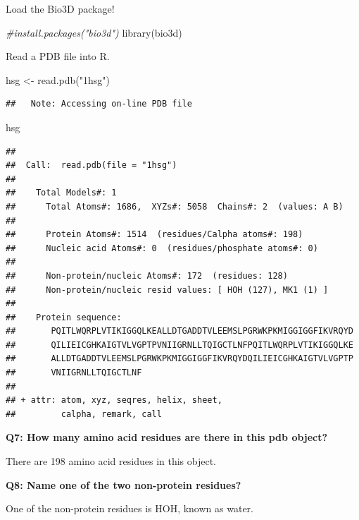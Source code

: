 \documentclass[
]{article}
\newenvironment{Shaded}{\begin{snugshade}}{\end{snugshade}}
\newcommand{\CommentTok}[1]{\textcolor[rgb]{0.56,0.35,0.01}{\textit{#1}}}
\newcommand{\FunctionTok}[1]{\textcolor[rgb]{0.00,0.00,0.00}{#1}}
\newcommand{\NormalTok}[1]{#1}
\newcommand{\OtherTok}[1]{\textcolor[rgb]{0.56,0.35,0.01}{#1}}
\newcommand{\StringTok}[1]{\textcolor[rgb]{0.31,0.60,0.02}{#1}}
\begin{document}
Load the Bio3D package!

\begin{Shaded}
\begin{Highlighting}[]
\CommentTok{\#install.packages("bio3d")}
\FunctionTok{library}\NormalTok{(bio3d)}
\end{Highlighting}
\end{Shaded}

Read a PDB file into R.

\begin{Shaded}
\begin{Highlighting}[]
\NormalTok{hsg }\OtherTok{\textless{}{-}} \FunctionTok{read.pdb}\NormalTok{(}\StringTok{"1hsg"}\NormalTok{)}
\end{Highlighting}
\end{Shaded}

\begin{verbatim}
##   Note: Accessing on-line PDB file
\end{verbatim}

\begin{Shaded}
\begin{Highlighting}[]
\NormalTok{hsg}
\end{Highlighting}
\end{Shaded}

\begin{verbatim}
## 
##  Call:  read.pdb(file = "1hsg")
## 
##    Total Models#: 1
##      Total Atoms#: 1686,  XYZs#: 5058  Chains#: 2  (values: A B)
## 
##      Protein Atoms#: 1514  (residues/Calpha atoms#: 198)
##      Nucleic acid Atoms#: 0  (residues/phosphate atoms#: 0)
## 
##      Non-protein/nucleic Atoms#: 172  (residues: 128)
##      Non-protein/nucleic resid values: [ HOH (127), MK1 (1) ]
## 
##    Protein sequence:
##       PQITLWQRPLVTIKIGGQLKEALLDTGADDTVLEEMSLPGRWKPKMIGGIGGFIKVRQYD
##       QILIEICGHKAIGTVLVGPTPVNIIGRNLLTQIGCTLNFPQITLWQRPLVTIKIGGQLKE
##       ALLDTGADDTVLEEMSLPGRWKPKMIGGIGGFIKVRQYDQILIEICGHKAIGTVLVGPTP
##       VNIIGRNLLTQIGCTLNF
## 
## + attr: atom, xyz, seqres, helix, sheet,
##         calpha, remark, call
\end{verbatim}

\textbf{Q7: How many amino acid residues are there in this pdb object?}

There are 198 amino acid residues in this object.

\textbf{Q8: Name one of the two non-protein residues?}

One of the non-protein residues is HOH, known as water.
\end{document}
